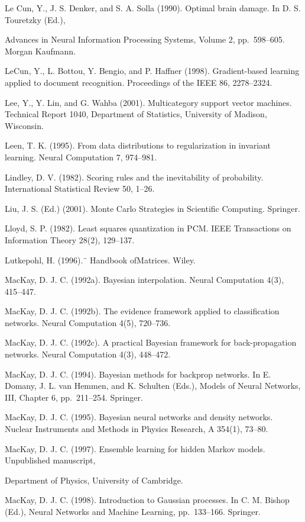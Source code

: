 \documentclass[
  10
]{article}
\begin{document}
Le Cun, Y., J. S. Denker, and S. A. Solla (1990). Optimal brain damage.
In D. S. Touretzky (Ed.),

Advances in Neural Information Processing Systems, Volume 2,
pp.~598--605. Morgan Kaufmann.

LeCun, Y., L. Bottou, Y. Bengio, and P. Haffner (1998). Gradient-based
learning applied to document recognition. Proceedings of the IEEE 86,
2278--2324.

Lee, Y., Y. Lin, and G. Wahba (2001). Multicategory support vector
machines. Technical Report 1040, Department of Statistics, University of
Madison, Wisconsin.

Leen, T. K. (1995). From data distributions to regularization in
invariant learning. Neural Computation 7, 974--981.

Lindley, D. V. (1982). Scoring rules and the inevitability of
probability. International Statistical Review 50, 1--26.

Liu, J. S. (Ed.) (2001). Monte Carlo Strategies in Scientific Computing.
Springer.

Lloyd, S. P. (1982). Least squares quantization in PCM. IEEE
Transactions on Information Theory 28(2), 129--137.

Lutkepohl, H. (1996).¨ Handbook ofMatrices. Wiley.

MacKay, D. J. C. (1992a). Bayesian interpolation. Neural Computation
4(3), 415--447.

MacKay, D. J. C. (1992b). The evidence framework applied to
classification networks. Neural Computation 4(5), 720--736.

MacKay, D. J. C. (1992c). A practical Bayesian framework for
back-propagation networks. Neural Computation 4(3), 448--472.

MacKay, D. J. C. (1994). Bayesian methods for backprop networks. In E.
Domany, J. L. van Hemmen, and K. Schulten (Eds.), Models of Neural
Networks, III, Chapter 6, pp.~211--254. Springer.

MacKay, D. J. C. (1995). Bayesian neural networks and density networks.
Nuclear Instruments and Methods in Physics Research, A 354(1), 73--80.

MacKay, D. J. C. (1997). Ensemble learning for hidden Markov models.
Unpublished manuscript,

Department of Physics, University of Cambridge.

MacKay, D. J. C. (1998). Introduction to Gaussian processes. In C. M.
Bishop (Ed.), Neural Networks and Machine Learning, pp.~133--166.
Springer.
\end{document}
